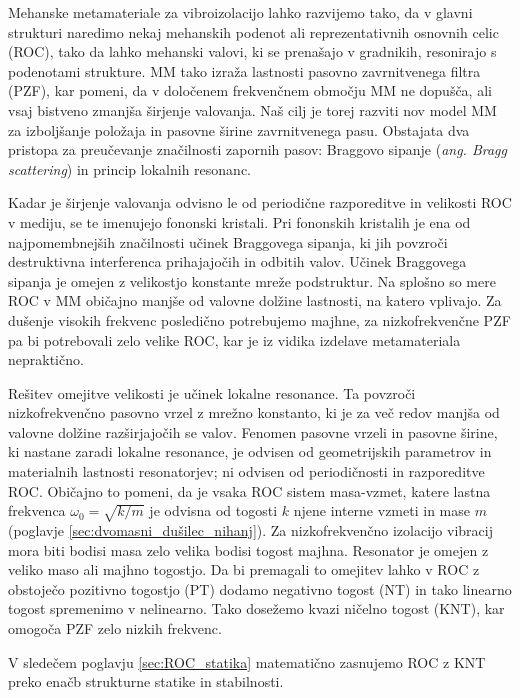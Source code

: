     Mehanske metamateriale za vibroizolacijo lahko razvijemo tako, da v glavni strukturi naredimo nekaj mehanskih podenot ali reprezentativnih osnovnih celic (ROC), tako da lahko mehanski valovi, ki se prenašajo v gradnikih, resonirajo s podenotami strukture. MM tako izraža lastnosti pasovno zavrnitvenega filtra (PZF), kar pomeni, da v določenem frekvenčnem območju MM ne dopušča, ali vsaj bistveno zmanjša širjenje valovanja. Naš cilj je torej razviti nov model MM za izboljšanje položaja in pasovne širine zavrnitvenega pasu. Obstajata dva pristopa za preučevanje značilnosti zapornih pasov: Braggovo sipanje (\textit{ang. Bragg scattering}) in princip lokalnih resonanc. 
    
    Kadar je širjenje valovanja odvisno le od periodične razporeditve in velikosti ROC v mediju, se te imenujejo fononski kristali. Pri fononskih kristalih je ena od najpomembnejših značilnosti učinek Braggovega sipanja, ki jih povzroči destruktivna interferenca prihajajočih in odbitih valov. Učinek Braggovega sipanja je omejen z velikostjo konstante mreže podstruktur. Na splošno so mere ROC v MM običajno manjše od valovne dolžine lastnosti, na katero vplivajo. Za dušenje visokih frekvenc posledično potrebujemo majhne, za nizkofrekvenčne PZF pa bi potrebovali zelo velike ROC, kar je iz vidika izdelave metamateriala nepraktično. 
    
    Rešitev omejitve velikosti je učinek lokalne resonance. Ta povzroči nizkofrekvenčno pasovno vrzel z mrežno konstanto, ki je za več redov manjša od valovne dolžine razširjajočih se valov. Fenomen pasovne vrzeli in pasovne širine, ki nastane zaradi lokalne resonance, je odvisen od geometrijskih parametrov in materialnih lastnosti resonatorjev; ni odvisen od periodičnosti in razporeditve ROC. Običajno to pomeni, da je vsaka ROC sistem masa-vzmet, katere lastna frekvenca $\omega_0=\sqrt{k/m}$ je odvisna od togosti $k$ njene interne vzmeti in mase $m$ (poglavje \ref{sec:dvomasni_dušilec_nihanj}). Za nizkofrekvenčno izolacijo vibracij mora biti bodisi masa zelo velika bodisi togost majhna. Resonator je omejen z veliko maso ali majhno togostjo. Da bi premagali to omejitev lahko v ROC z obstoječo pozitivno togostjo (PT) dodamo negativno togost (NT) in tako linearno togost spremenimo v nelinearno. Tako dosežemo kvazi ničelno togost (KNT), kar omogoča PZF zelo nizkih frekvenc.  
    
    V sledečem poglavju \ref{sec:ROC_statika} matematično zasnujemo ROC z KNT preko enačb strukturne statike in stabilnosti.
    
